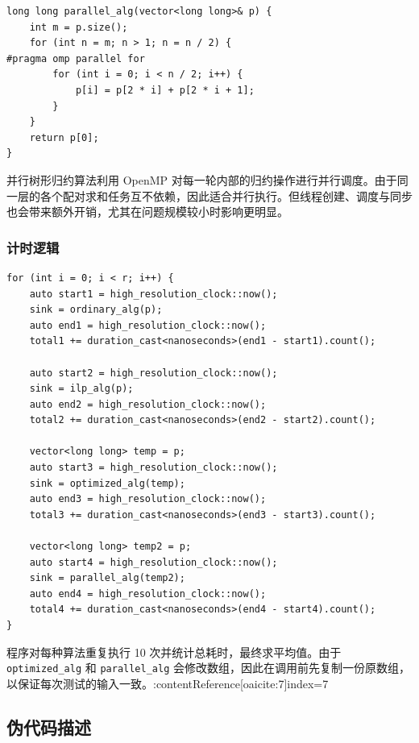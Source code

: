 \documentclass[a4paper,12pt]{ctexart}
\begin{document}
\begin{lstlisting}
long long parallel_alg(vector<long long>& p) {
    int m = p.size();
    for (int n = m; n > 1; n = n / 2) {
#pragma omp parallel for
        for (int i = 0; i < n / 2; i++) {
            p[i] = p[2 * i] + p[2 * i + 1];
        }
    }
    return p[0];
}
\end{lstlisting}

并行树形归约算法利用 OpenMP 对每一轮内部的归约操作进行并行调度。由于同一层的各个配对求和任务互不依赖，因此适合并行执行。但线程创建、调度与同步也会带来额外开销，尤其在问题规模较小时影响更明显。

\subsubsection{计时逻辑}

\begin{lstlisting}
for (int i = 0; i < r; i++) {
    auto start1 = high_resolution_clock::now();
    sink = ordinary_alg(p);
    auto end1 = high_resolution_clock::now();
    total1 += duration_cast<nanoseconds>(end1 - start1).count();

    auto start2 = high_resolution_clock::now();
    sink = ilp_alg(p);
    auto end2 = high_resolution_clock::now();
    total2 += duration_cast<nanoseconds>(end2 - start2).count();

    vector<long long> temp = p;
    auto start3 = high_resolution_clock::now();
    sink = optimized_alg(temp);
    auto end3 = high_resolution_clock::now();
    total3 += duration_cast<nanoseconds>(end3 - start3).count();

    vector<long long> temp2 = p;
    auto start4 = high_resolution_clock::now();
    sink = parallel_alg(temp2);
    auto end4 = high_resolution_clock::now();
    total4 += duration_cast<nanoseconds>(end4 - start4).count();
}
\end{lstlisting}

程序对每种算法重复执行 10 次并统计总耗时，最终求平均值。由于 \texttt{optimized\_alg} 和 \texttt{parallel\_alg} 会修改数组，因此在调用前先复制一份原数组，以保证每次测试的输入一致。:contentReference[oaicite:7]{index=7}

\subsection{伪代码描述}
\end{document}
